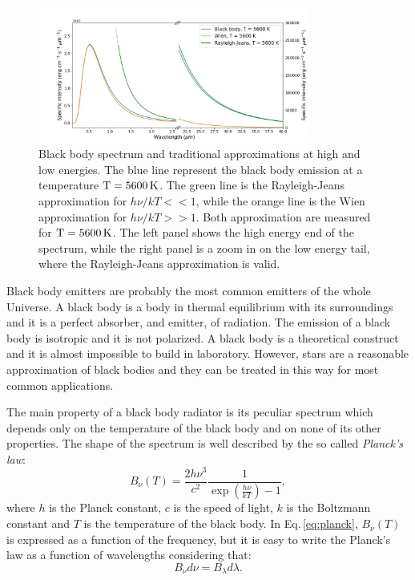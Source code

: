 \documentclass[../main.tex]{subfiles}
\begin{document}
\begin{figure}
\centering
\includegraphics[width=0.8\textwidth]{images/BB.jpg} 
\caption[]{Black body spectrum and traditional approximations at high and low energies. The blue line represent the black body emission at a temperature $\rm T = 5600\,\si{K}$. The green line is the Rayleigh-Jeans approximation for $h\nu/kT<<1$, while the orange line is the Wien approximation for $h\nu/kT>>1$. Both approximation are measured for $\rm T = 5600\,\si{K}$. The left panel shows the high energy end of the spectrum, while the right panel is a zoom in on the low energy tail, where the Rayleigh-Jeans approximation  is valid.}
\label{fig:BB_emission}
\end{figure}

Black body emitters are probably the most common emitters of the whole Universe.
A black body is a body in thermal equilibrium with its surroundings and it is a perfect absorber, and emitter, of radiation.
The emission of a black body is isotropic and it is not polarized.
A black body is a theoretical construct and it is almost impossible to build in laboratory.
However, stars are a reasonable approximation of black bodies and they can be treated in this way for most common applications.

The main property of a black body radiator is its peculiar spectrum which depends only on the temperature of the black body and on none of its other properties.
The shape of the spectrum is well described by the so called \emph{Planck's law}:
\begin{equation}
    \label{eq:planck}
    B_{\nu}(T) = \frac{2h\nu^3}{c^2}\frac{1}{\exp{\left(\frac{h\nu}{kT}\right)} - 1},
\end{equation}
where $h$ is the Planck constant, $c$ is the speed of light, $k$ is the Boltzmann constant and $T$ is the temperature of the black body.
In Eq.\,\ref{eq:planck}, $B_{\nu}(T)$ is expressed as a function of the frequency, but it is easy to write the Planck's law as a function of wavelengths considering that:
\begin{equation}
    \label{eq:transform}
    B_{\nu}d\nu = B_{\lambda}d\lambda.
\end{equation}
\end{document}
